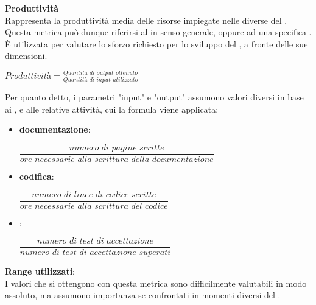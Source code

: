 \textbf{Produttività}\\

Rappresenta la produttività media delle risorse impiegate nelle diverse  del . Questa metrica può dunque riferirsi al  in senso generale, oppure ad una specifica .\\ \`E utilizzata per valutare lo sforzo richiesto per lo sviluppo del , a fronte delle sue dimensioni.
\begin{center}
\begin{math}
	\textit{Produttività} = \frac	{\textit{Quantità di output ottenuto}}
									{\textit{Quantità di input utilizzato}}
\end{math}
\end{center}
Per quanto detto, i parametri "input" e "output" assumono valori diversi in base ai , e alle relative attività, cui la formula viene applicata:
\begin{itemize}
	\item \textbf{documentazione}:
	\begin{center} 
		\begin{math}
			\dfrac	{\textit{numero di pagine scritte}}
					{\textit{ore necessarie alla scrittura della documentazione}}
		\end{math}
	\end{center}	
	\item \textbf{codifica}:
	\begin{center} 
		\begin{math}
			\dfrac	{\textit{numero di linee di codice scritte}}
					{\textit{ore necessarie alla scrittura del codice}}
		\end{math}
	\end{center}			
	\item \textbf{}: 
	\begin{center}
		\begin{math}
			\dfrac	{\textit{numero di test di accettazione}}
					{\textit{numero di test di accettazione superati}}
		\end{math}
	\end{center}		
\end{itemize}

\textbf{Range utilizzati}: \\

I valori che si ottengono con questa metrica sono difficilmente valutabili in modo assoluto, ma assumono importanza se confrontati in momenti diversi del .

